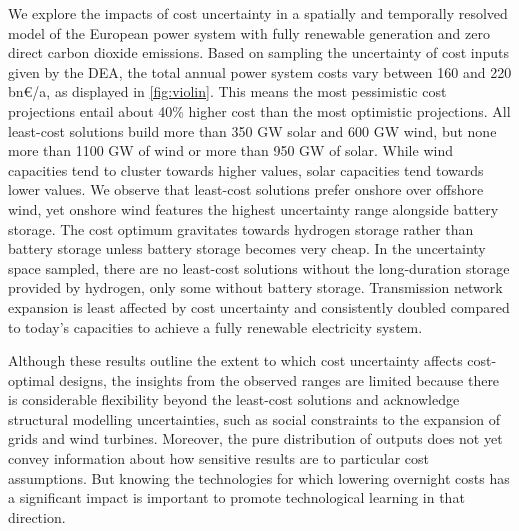 
We explore the impacts of cost uncertainty in a spatially and temporally
resolved model of the European power system with fully renewable generation and
zero direct carbon dioxide emissions. Based on sampling the uncertainty of cost
inputs given by the DEA,\cite{DEA} the total annual power system costs vary
between 160 and 220 bn\euro/a, as displayed in \cref{fig:violin}. This means the
most pessimistic cost projections entail about 40\% higher cost than the most
optimistic projections. All least-cost solutions build more than 350 GW solar
and 600 GW wind, but none more than 1100 GW of wind or more than 950 GW of
solar. While wind capacities tend to cluster towards higher values, solar
capacities tend towards lower values. We observe that least-cost solutions
prefer onshore over offshore wind, yet onshore wind features the highest
uncertainty range alongside battery storage. The cost optimum gravitates towards
hydrogen storage rather than battery storage unless battery storage becomes very
cheap. In the uncertainty space sampled, there are no least-cost solutions
without the long-duration storage provided by hydrogen, only some without
battery storage. Transmission network expansion is least affected by cost
uncertainty and consistently doubled compared to today's capacities to achieve a
fully renewable electricity system.

Although these results outline the extent to which cost uncertainty affects
cost-optimal designs, the insights from the observed ranges are limited because
there is considerable flexibility beyond the least-cost solutions and
acknowledge structural modelling uncertainties, such as social constraints to
the expansion of grids and wind turbines. Moreover, the pure distribution of
outputs does not yet convey information about how sensitive results are to
particular cost assumptions. But knowing the technologies for which lowering
overnight costs has a significant impact is important to promote technological
learning in that direction.


